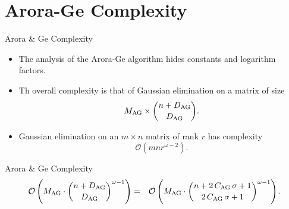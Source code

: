 \documentclass[10pt]{beamer}
\newcommand{\AroraGe}{Arora \& Ge\xspace}
\newcommand{\bigO}[1]{\ensuremath{\mathcal{O}\left({#1}\right)}\xspace}
\def\DAG{D_{{\rm AG}}}
\def\MAG{M_{{\rm AG}}}
\def\CAG{C_{{\rm AG}}}
\newcommand{\cemph}[1]{{\color{yellow9}{\bf #1}}\xspace}
\begin{document}
\section{Arora-Ge Complexity}

\begin{frame}{\AroraGe Complexity}

\begin{itemize}
  \item The analysis of the Arora-Ge algorithm hides constants \cemph{in the exponent} and logarithm factors.
  \framebreak
  \item Th overall complexity is that of Gaussian elimination on a matrix of size $$\MAG \times \binom{n + \DAG}{\DAG}.$$
 \item Gaussian elimination on an $m \times n$ matrix of rank $r$ has complexity $$\bigO{mnr^{\omega-2}}.$$
\end{itemize}

\begin{block}{\AroraGe Complexity}
\begin{eqnarray*}
\bigO{\MAG \cdot \binom{n + \DAG}{\DAG}^{\omega-1}} &=& \bigO{\MAG \cdot \binom{n + 2\,\CAG\, \sigma + 1}{2\, \CAG\,\sigma + 1}^{\omega-1}}.%
\end{eqnarray*}
\end{block}
\end{frame}
\end{document}
